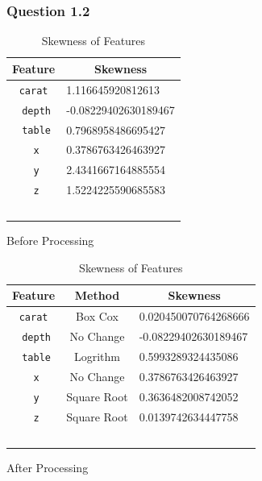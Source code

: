 \documentclass[11pt,letterpaper]{article}
\begin{document}
\subsubsection*{Question 1.2}
\begin{table}[H]
    \begin{subtable}[H]{0.45\textwidth}
    \centering
    \begin{tabular}{c l}
        \hline
        Feature & \multicolumn{1}{c}{Skewness} \\
        \hline
        \texttt{carat} & 1.116645920812613  \\ \
        \texttt{depth} & -0.08229402630189467 \\ \
        \texttt{table} &  0.7968958486695427\\ \
        \texttt{x} & 0.3786763426463927  \\ \
       \texttt{y} & 2.4341667164885554  \\ \
        \texttt{z} & 1.5224225590685583  \\ \
    \end{tabular}
    \caption{Before Processing}
    \end{subtable}
    \begin{subtable}[H]{0.45\textwidth}
        \centering
        \begin{tabular}{c c l}
            \hline
            Feature & Method & \multicolumn{1}{c}{Skewness} \\
            \hline
            \texttt{carat} & Box Cox & 0.020450070764268666 \\ \
            \texttt{depth} & No Change & -0.08229402630189467 \\ \
            \texttt{table} &  Logrithm & 0.5993289324435086\\ \
            \texttt{x} & No Change & 0.3786763426463927  \\ \
           \texttt{y} & Square Root & 0.3636482008742052  \\ \
            \texttt{z} & Square Root & 0.0139742634447758  \\ \
        \end{tabular}
        \caption{After Processing}
        \end{subtable}
    \caption{Skewness of Features}
\end{table}
\end{document}

